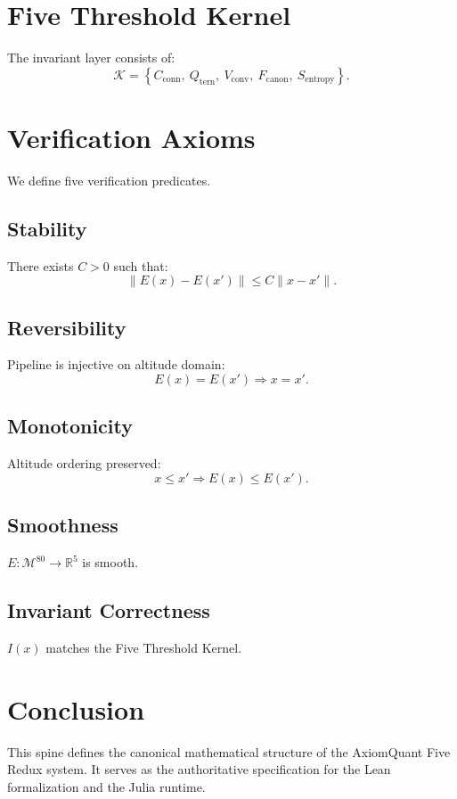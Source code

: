\documentclass[11pt]{article}
\begin{document}
\section{Five Threshold Kernel}
The invariant layer consists of:
\[
\mathcal{K} =
\left\{
C_{\text{conn}},\ 
Q_{\text{tern}},\ 
V_{\text{conv}},\ 
F_{\text{canon}},\ 
S_{\text{entropy}}
\right\}.
\]

\section{Verification Axioms}
We define five verification predicates.

\subsection{Stability}
There exists $C > 0$ such that:
\[
\| E(x) - E(x') \| \le C \| x - x' \|.
\]

\subsection{Reversibility}
Pipeline is injective on altitude domain:
\[
E(x) = E(x') \Rightarrow x = x'.
\]

\subsection{Monotonicity}
Altitude ordering preserved:
\[
x \le x' \Rightarrow E(x) \le E(x').
\]

\subsection{Smoothness}
$E : \mathcal{M}^{80} \to \mathbb{R}^5$ is smooth.

\subsection{Invariant Correctness}
$I(x)$ matches the Five Threshold Kernel.

\section{Conclusion}
This spine defines the canonical mathematical structure of the AxiomQuant Five
Redux system. It serves as the authoritative specification for the Lean
formalization and the Julia runtime.
\end{document}
